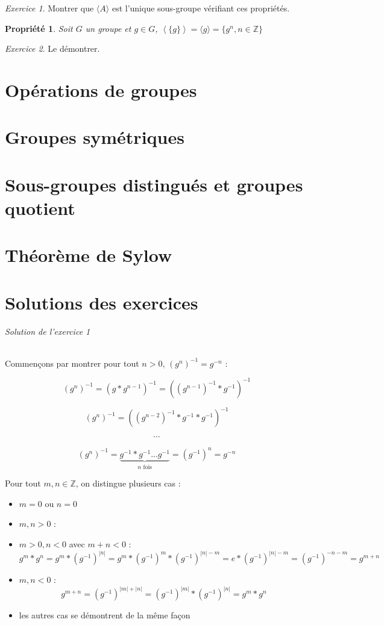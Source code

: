 \documentclass[]{article}
\newtheorem{myproperty}{Propriété}
\theoremstyle{remark}
\newtheorem{myexer}{Exercice}
\theoremstyle{definition}
\begin{document}
\begin{myexer}
	Montrer que $\langle A \rangle$ est l'unique sous-groupe vérifiant ces propriétés.
\end{myexer}

\begin{myproperty}
	Soit $G$ un groupe et $g \in G$, $\left\langle\{g\}\right\rangle = \langle g \rangle = \{g^n, n \in \mathbb{Z}\}$
\end{myproperty}

\begin{myexer}
	Le démontrer.
\end{myexer}

\part{Opérations de groupes}
\part{Groupes symétriques}
\part{Sous-groupes distingués et groupes quotient}
\part{Théorème de Sylow}

\part{Solutions des exercices}

\paragraph{Solution de l'exercice 1}

Commençons par montrer pour tout $n > 0$, $( g^n )^{-1} = g^{-n}$ :

$$\left( g^n \right)^{-1} = (g * g^{n-1})^{-1} = ((g^{n-1})^{-1}*g^{-1})^{-1}$$

$$\left( g^n \right)^{-1} = ((g^{n-2})^{-1}*g^{-1}*g^{-1})^{-1}$$

$$\cdots$$

$$\left( g^n \right)^{-1} = \underbrace{g^{-1}*g^{-1} ... g^{-1}}_{n \text{ fois}} = (g^{-1})^n = g^{-n}$$

Pour tout $m, n \in \mathbb{Z}$, on distingue plusieurs cas :
\begin{itemize}
	\item $m = 0$ ou $n = 0$ \checkmark
	\item $m, n > 0$ : \checkmark
	\item $m > 0, n < 0$ avec $m + n < 0$ : $$g^m * g^n = g^m * \left(g^{-1}\right)^{|n|} = g^m*\left(g^{-1}\right)^m*\left(g^{-1}\right)^{|n| - m} = e * \left(g^{-1}\right)^{|n|-m}=\left(g^{-1}\right)^{-n-m}=g^{m+n}$$
	\item $m, n < 0$ : $$g^{m+n}=\left(g^{-1}\right)^{|m|+|n|}=\left(g^{-1}\right)^{|m|}*\left(g^{-1}\right)^{|n|}=g^m*g^n$$
	\item les autres cas se démontrent de la même façon
\end{itemize}
\end{document}
